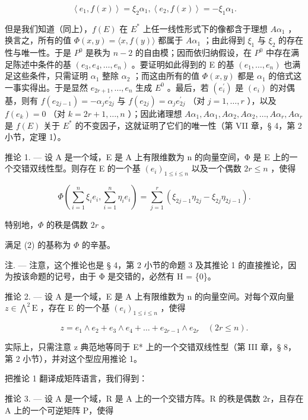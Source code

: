 \[
\left\langle e _ {1}, f (x) \right\rangle = \xi_ {2} \alpha_ {1}, \left\langle e _ {2}, f (x) \right\rangle = - \xi_ {1} \alpha_ {1}.
\]

但是我们知道（同上），\(f(E)\) 在 \(E^{*}\) 上任一线性形式下的像都含于理想 \(A\alpha_{1}\) ，换言之，所有的值 \(\Phi(x,y)=\langle x,f(y)\rangle\) 都属于 \(A\alpha_{1}\) ；由此得到 \(\xi_{1}\) 与 \(\xi_{2}\) 的存在性与唯一性。于是 \(P^{0}\) 是秩为 \(n-2\) 的自由模；因而依归纳假设，在 \(P^{0}\) 中存在满足陈述中条件的基 \((e_{3},e_{4},\ldots,e_{n})\) 。要证明如此得到的 E 的基 \((e_{1},\ldots,e_{n})\) 也满足这些条件，只需证明 \(\alpha_{1}\) 整除 \(\alpha_{2}\) ；而这由所有的值 \(\Phi(x,y)\) 都是 \(\alpha_{1}\) 的倍式这一事实得出。于是显然 \(e_{2r+1},\ldots,e_{n}\) 生成 \(E^{0}\) 。最后，若 \((e_{i}^{\prime})\) 是 \((e_{i})\) 的对偶基，则有 \(f(e_{2j-1})=-\alpha_{j}e_{2j}^{\prime}\) 与 \(f(e_{2j})=\alpha_{j}e_{2j}^{\prime}\) （对 \(j=1,\ldots,r\) ），以及 \(f(e_{k})=0\) （对 \(k=2r+1,\ldots,n\) ）；因此诸理想 \(A\alpha_{1},A\alpha_{1},A\alpha_{2},A\alpha_{2},\ldots,A\alpha_{r},A\alpha_{r}\) 是 \(f(E)\) 关于 \(E^{*}\) 的不变因子，这就证明了它们的唯一性（第 VII 章，§ 4，第 2 小节，定理 1）。

推论 1. --- 设 A 是一个域，E 是 A 上有限维数为 n 的向量空间，Φ 是 E 上的一个交错双线性型。则存在 E 的一个基 \((e_i)_{1\leqslant i\leqslant n}\) 以及一个偶数 \(2r\leqslant n\) ，使得

\[
\Phi (\sum_ {i = 1} ^ {n} \xi_ {i} e _ {i}, \sum_ {i = 1} ^ {n} \eta_ {i} e _ {i}) = \sum_ {j = 1} ^ {r} (\xi_ {2 j - 1} \eta_ {2 j} - \xi_ {2 j} \eta_ {2 j - 1}).\tag{2}
\]

特别地，\(\Phi\) 的秩是偶数 \(2r\) 。

满足 (2) 的基称为 \(\Phi\) 的辛基。

注. --- 注意，这个推论也是 § 4，第 2 小节的命题 3 及其推论 1 的直接推论，因为按该命题的记号，由于 Φ 是交错的，必然有 H = \{0\}。

推论 2. --- 设 A 是一个域，E 是 A 上有限维数为 n 的向量空间。对每个双向量 \(z \in \bigwedge^{2} \mathrm{E}\) ，存在 E 的一个基 \((e_i)_{1 \leqslant i \leqslant n}\) ，使得

\[
z = e _ {1} \wedge e _ {2} + e _ {3} \wedge e _ {4} + \dots + e _ {2 r - 1} \wedge e _ {2 r} \quad (2 r \leqslant n).
\]

实际上，只需注意 z 典范地等同于 E* 上的一个交错双线性型（第 III 章，§ 8，第 2 小节），并对这个型应用推论 1。

把推论 1 翻译成矩阵语言，我们得到：

推论 3. --- 设 A 是一个域，R 是 A 上的一个交错方阵。R 的秩是偶数 2r，且存在 A 上的一个可逆矩阵 P，使得

